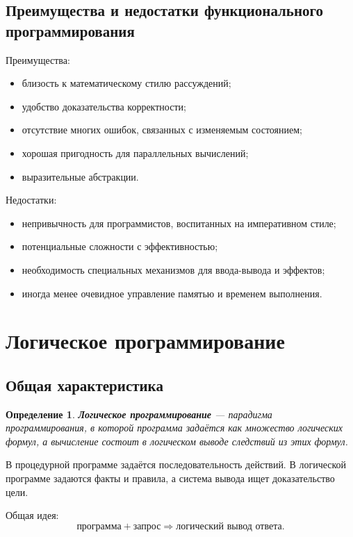 \documentclass[12pt,a4paper]{article}
\newtheorem{definition}{Определение}
\begin{document}
\subsection{Преимущества и недостатки функционального программирования}

Преимущества:
\begin{itemize}
    \item близость к математическому стилю рассуждений;
    \item удобство доказательства корректности;
    \item отсутствие многих ошибок, связанных с изменяемым состоянием;
    \item хорошая пригодность для параллельных вычислений;
    \item выразительные абстракции.
\end{itemize}

Недостатки:
\begin{itemize}
    \item непривычность для программистов, воспитанных на императивном стиле;
    \item потенциальные сложности с эффективностью;
    \item необходимость специальных механизмов для ввода-вывода и эффектов;
    \item иногда менее очевидное управление памятью и временем выполнения.
\end{itemize}

\section{Логическое программирование}

\subsection{Общая характеристика}

\begin{definition}
\textbf{Логическое программирование} --- парадигма программирования, в которой программа задаётся как множество логических формул, а вычисление состоит в логическом выводе следствий из этих формул.
\end{definition}

В процедурной программе задаётся последовательность действий. В логической программе задаются факты и правила, а система вывода ищет доказательство цели.

Общая идея:
$$
\text{программа} + \text{запрос} \Longrightarrow \text{логический вывод ответа}.
$$
\end{document}
